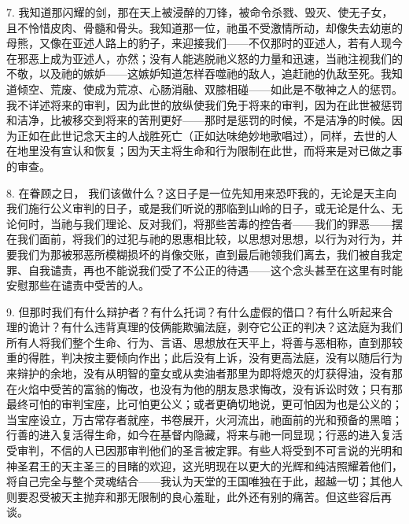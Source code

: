 7. 我知道那闪耀的剑，那在天上被浸醉的刀锋，被命令杀戮、毁灭、使无子女，且不怜惜皮肉、骨髓和骨头。我知道那一位，祂虽不受激情所动，却像失去幼崽的母熊，又像在亚述人路上的豹子，来迎接我们——不仅那时的亚述人，若有人现今在邪恶上成为亚述人，亦然；没有人能逃脱祂义怒的力量和迅速，当祂注视我们的不敬，以及祂的嫉妒——这嫉妒知道怎样吞噬祂的敌人，追赶祂的仇敌至死。我知道倾空、荒废、使成为荒凉、心肠消融、双膝相碰——如此是不敬神之人的惩罚。我不详述将来的审判，因为此世的放纵使我们免于将来的审判，因为在此世被惩罚和洁净，比被移交到将来的苦刑更好——那时是惩罚的时候，不是洁净的时候。因为正如在此世记念天主的人战胜死亡（正如达味绝妙地歌唱过），同样，去世的人在地里没有宣认和恢复；因为天主将生命和行为限制在此世，而将来是对已做之事的审查。\par

8. 在眷顾之日， 我们该做什么？这日子是一位先知用来恐吓我的，无论是天主向我们施行公义审判的日子，或是我们听说的那临到山岭的日子，或无论是什么、无论何时，当祂与我们理论、反对我们，将那些苦毒的控告者——我们的罪恶——摆在我们面前，将我们的过犯与祂的恩惠相比较，以思想对思想，以行为对行为，并要我们为那被邪恶所模糊损坏的肖像交账，直到最后祂领我们离去，我们被自我定罪、自我谴责，再也不能说我们受了不公正的待遇——这个念头甚至在这里有时能安慰那些在谴责中受苦的人。\par

9. 但那时我们有什么辩护者？有什么托词？有什么虚假的借口？有什么听起来合理的诡计？有什么违背真理的伎俩能欺骗法庭，剥夺它公正的判决？这法庭为我们所有人将我们整个生命、行为、言语、思想放在天平上，将善与恶相称，直到那较重的得胜，判决按主要倾向作出；此后没有上诉，没有更高法庭，没有以随后行为来辩护的余地，没有从明智的童女或从卖油者那里为即将熄灭的灯获得油，没有那在火焰中受苦的富翁的悔改，也没有为他的朋友恳求悔改，没有诉讼时效；只有那最终可怕的审判宝座，比可怕更公义；或者更确切地说，更可怕因为也是公义的；当宝座设立，万古常存者就座，书卷展开，火河流出，祂面前的光和预备的黑暗；行善的进入复活得生命，如今在基督内隐藏，将来与祂一同显现；行恶的进入复活受审判，不信的人已因那审判他们的圣言被定罪。有些人将受到不可言说的光明和神圣君王的天主圣三的目睹的欢迎，这光明现在以更大的光辉和纯洁照耀着他们，将自己完全与整个灵魂结合——我认为天堂的王国唯独在于此，超越一切；其他人则要忍受被天主抛弃和那无限制的良心羞耻，此外还有别的痛苦。但这些容后再谈。\par

